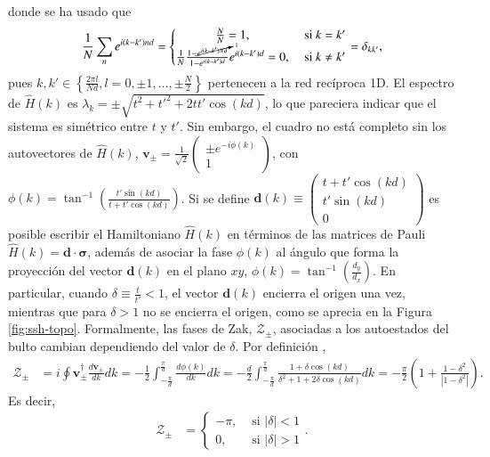 donde se ha usado que $$\frac{1}{N}\sum_n e^{i(k-k')nd} = \left\{\begin{matrix} \frac{N}{N}=1, &\text{ si } k = k'
\\ \frac{1}{N}\frac{1-\cancelto{1}{e^{i(k-k')Nd}}}{1-e^{i(k-k')d}}e^{i(k-k')d}=0, &\text{ si } k\neq k'
\end{matrix}\right. =\delta_{kk'},$$ pues $k, k' \in  \left\{\frac{2\pi l}{Nd}, l=0,\pm 1, \dots , \pm \frac{N}{2}\right\}$ pertenecen a la red recíproca 1D. El espectro de $\hat{H}(k)$ es $\lambda_k = \pm\sqrt{t^2+t'^2+2tt'\cos(kd)}$, lo que pareciera indicar que el sistema es simétrico entre $t$ y $t'$. Sin embargo, el cuadro no está completo sin los autovectores de $\hat{H}(k)$, $\textbf{v}_\pm =\frac{1}{\sqrt{2}} \begin{pmatrix} \pm e^{-i\phi(k)} \\  1 \end{pmatrix}$, con $\phi(k)=\tan^{-1}\left(\frac{t'\sin(kd)}{t+t'\cos(kd)}\right)$. Si se define $\textbf{d}(k) \equiv \begin{pmatrix}t+t'\cos(kd) \\ t'\sin(kd) \\ 0 \end{pmatrix}$ es posible escribir el Hamiltoniano $\hat{H}(k)$ en términos de las matrices de Pauli $\hat{H}(k) = \textbf{d} \cdot \bm{\sigma}$, además de asociar la fase $\phi(k)$ al ángulo que forma la proyección del vector $\textbf{d}(k)$ en el plano $xy$,  $\phi(k)=\tan^{-1}\left( \frac{d_y}{d_x} \right)$. En particular, cuando $\delta \equiv \frac{t}{t'} < 1$, el vector $\textbf{d}(k)$ encierra el origen una vez, mientras que para $\delta > 1$ no se encierra el origen, como se aprecia en la Figura \ref{fig:ssh-topo}. Formalmente, las fases de Zak, $\mathcal{Z}_\pm$, asociadas a los autoestados del bulto cambian dependiendo del valor de $\delta$. Por definición \citep{zak_berry}, \begin{align*}
\mathcal{Z}_\pm &= i \oint \textbf{v}_\pm^\dagger \frac{d \textbf{v}_\pm}{dk}  dk  = -\frac{1}{2} \int_{-\frac{\pi}{d}}^{{\frac{\pi}{d}}}  \frac{d \phi(k)}{d k} dk = -\frac{d}{2}\int_{-\frac{\pi}{d}}^{{\frac{\pi}{d}}} \frac{1+\delta\cos(kd)}{\delta^2+1+2\delta\cos(kd)} dk = -\frac{\pi}{2} \left(1 + \frac{1-\delta^2}{\left|1-\delta^2\right|} \right) .
\end{align*}
Es decir, 
\begin{align*}
\mathcal{Z}_\pm &= \left\{\begin{matrix}
-\pi, &\text{ si } |\delta| < 1
\\
0, &\text{ si } |\delta| > 1
\end{matrix}\right. .
\end{align*}
